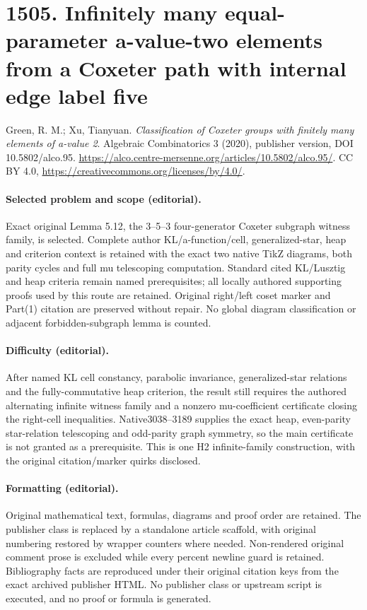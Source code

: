 \documentclass[10pt]{article}
\theoremstyle{definition}
\begin{document}
\section*{1505. Infinitely many equal-parameter a-value-two elements from a Coxeter path with internal edge label five}
Green, R. M.; Xu, Tianyuan. \emph{Classification of Coxeter groups with finitely many elements of a-value 2}. Algebraic Combinatorics 3 (2020), publisher version, DOI 10.5802/alco.95. \url{https://alco.centre-mersenne.org/articles/10.5802/alco.95/}. CC BY 4.0, \url{https://creativecommons.org/licenses/by/4.0/}.
\paragraph{Selected problem and scope (editorial).} Exact original Lemma 5.12, the 3–5–3 four-generator Coxeter subgraph witness family, is selected. Complete author KL/a-function/cell, generalized-star, heap and criterion context is retained with the exact two native TikZ diagrams, both parity cycles and full mu telescoping computation. Standard cited KL/Lusztig and heap criteria remain named prerequisites; all locally authored supporting proofs used by this route are retained. Original right/left coset marker and Part(1) citation are preserved without repair. No global diagram classification or adjacent forbidden-subgraph lemma is counted.
\paragraph{Difficulty (editorial).} After named KL cell constancy, parabolic invariance, generalized-star relations and the fully-commutative heap criterion, the result still requires the authored alternating infinite witness family and a nonzero mu-coefficient certificate closing the right-cell inequalities. Native3038–3189 supplies the exact heap, even-parity star-relation telescoping and odd-parity graph symmetry, so the main certificate is not granted as a prerequisite. This is one H2 infinite-family construction, with the original citation/marker quirks disclosed.
\paragraph{Formatting (editorial).} Original mathematical text, formulas, diagrams and proof order are retained. The publisher class is replaced by a standalone article scaffold, with original numbering restored by wrapper counters where needed. Non-rendered original comment prose is excluded while every percent newline guard is retained. Bibliography facts are reproduced under their original citation keys from the exact archived publisher HTML. No publisher class or upstream script is executed, and no proof or formula is generated.
\end{document}

